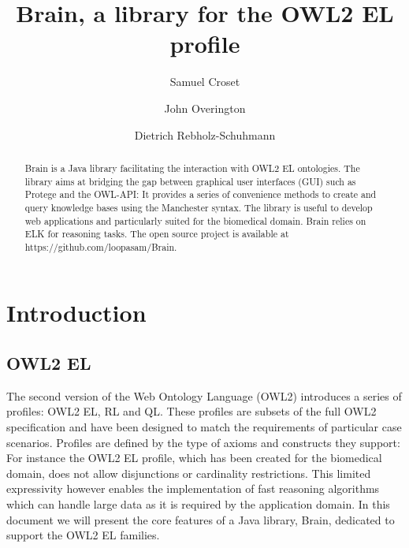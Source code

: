 \documentclass{llncs}
\begin{document}
%
\frontmatter          %
%
\pagestyle{headings}  %

\mainmatter              %
%
\title{Brain, a library for the OWL2 EL profile}
%
%
\author{Samuel Croset \and John Overington \and Dietrich Rebholz-Schuhmann}

\maketitle              %

\begin{abstract}
Brain is a Java library facilitating the interaction with OWL2 EL ontologies. 
The library aims at bridging the gap between graphical user interfaces (GUI) such as Protege and the OWL-API: It provides 
a series of convenience methods to create and query knowledge bases using the Manchester syntax. 
The library is useful to develop web applications and particularly suited for the biomedical domain. 
Brain relies on ELK for reasoning tasks. The open source project is available at https://github.com/loopasam/Brain.

\end{abstract}

\section{Introduction}
\subsection{OWL2 EL}
The second version of the Web Ontology Language (OWL2) introduces a series of profiles: OWL2 EL, RL and QL.
These profiles are subsets of the full OWL2 specification and have been designed to match the requirements of particular case scenarios.
Profiles are defined by the type of axioms and constructs they support: For instance the OWL2 EL profile, which has been 
created for the biomedical domain, does not allow 
disjunctions or cardinality restrictions. This limited expressivity however enables the implementation of fast reasoning algorithms which can
handle large data as it is required by the application domain. In this document we will present the core features of a 
Java library, Brain, dedicated to support the OWL2 EL families.
\end{document}
